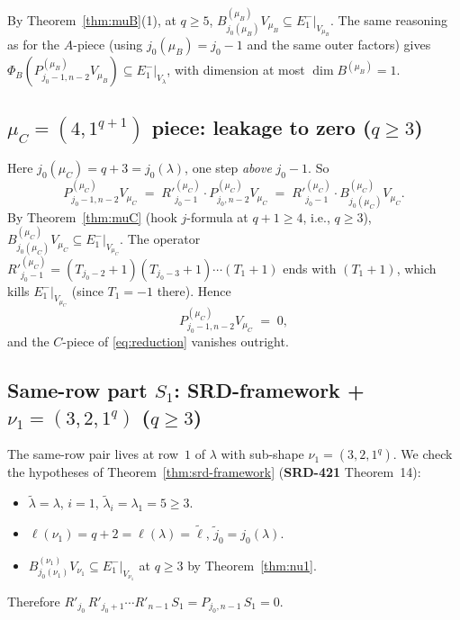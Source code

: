 \documentclass[11pt]{article}
\theoremstyle{definition}
\begin{document}
By Theorem~\ref{thm:muB}(1), at $q \ge 5$,
$B^{(\mu_B)}_{j_0(\mu_B)} V_{\mu_B} \subseteq E_1^-|_{V_{\mu_B}}$.
The same reasoning as for the $A$-piece (using
$j_0(\mu_B) = j_0 - 1$ and the same outer factors) gives
$\Phi_B(P^{(\mu_B)}_{j_0 - 1, n - 2} V_{\mu_B}) \subseteq
E_1^-|_{V_\lambda}$, with dimension at most $\dim B^{(\mu_B)} = 1$.

\subsection{$\mu_C = (4, 1^{q+1})$ piece: leakage to zero
($q \ge 3$)}\label{ssec:muC-leakage}

Here $j_0(\mu_C) = q + 3 = j_0(\lambda)$, one step \emph{above}
$j_0 - 1$. So
\[
   P^{(\mu_C)}_{j_0 - 1, n - 2} V_{\mu_C}
   \;=\; R'^{(\mu_C)}_{j_0 - 1} \cdot P^{(\mu_C)}_{j_0, n-2} V_{\mu_C}
   \;=\; R'^{(\mu_C)}_{j_0 - 1} \cdot B^{(\mu_C)}_{j_0(\mu_C)} V_{\mu_C}.
\]
By Theorem~\ref{thm:muC} (hook $j$-formula at $q + 1 \ge 4$, i.e.,
$q \ge 3$), $B^{(\mu_C)}_{j_0(\mu_C)} V_{\mu_C} \subseteq
E_1^-|_{V_{\mu_C}}$. The operator $R'^{(\mu_C)}_{j_0 - 1} =
(T_{j_0-2}{+}1)(T_{j_0-3}{+}1)\cdots(T_1{+}1)$ ends with $(T_1{+}1)$,
which kills $E_1^-|_{V_{\mu_C}}$ (since $T_1 = -1$ there). Hence
\[
   P^{(\mu_C)}_{j_0 - 1, n - 2} V_{\mu_C} \;=\; 0,
\]
and the $C$-piece of \eqref{eq:reduction} vanishes outright.

\subsection{Same-row part $S_1$: SRD-framework + $\nu_1 = (3, 2, 1^q)$
($q \ge 3$)}\label{ssec:S1-dies}

The same-row pair lives at row~$1$ of $\lambda$ with sub-shape
$\nu_1 = (3, 2, 1^q)$. We check the hypotheses of
Theorem~\ref{thm:srd-framework} (\textbf{SRD-421} Theorem~14):
\begin{itemize}[leftmargin=2em,topsep=0.2em,itemsep=0.1em]
\item $\widetilde\lambda = \lambda$, $i = 1$, $\widetilde\lambda_i =
\lambda_1 = 5 \ge 3$. \checkmark
\item $\ell(\nu_1) = q + 2 = \ell(\lambda) = \widetilde\ell$,
$\widetilde j_0 = j_0(\lambda)$. \checkmark
\item $B^{(\nu_1)}_{j_0(\nu_1)} V_{\nu_1} \subseteq E_1^-|_{V_{\nu_1}}$
at $q \ge 3$ by Theorem~\ref{thm:nu1}. \checkmark
\end{itemize}
Therefore $R'_{j_0}\, R'_{j_0+1} \cdots R'_{n-1}\, S_1
= P_{j_0, n-1}\, S_1 = 0$.
\end{document}
